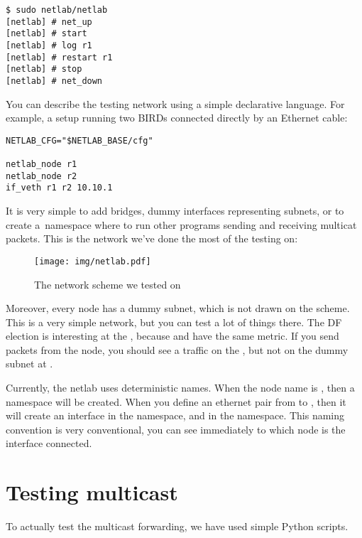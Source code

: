 \begin{lstlisting}
$ sudo netlab/netlab
[netlab] # net_up
[netlab] # start
[netlab] # log r1
[netlab] # restart r1
[netlab] # stop
[netlab] # net_down
\end{lstlisting}

\noindent You can describe the testing network using a simple declarative language. For
example, a setup running two BIRDs connected directly by an Ethernet cable:

\begin{lstlisting}
NETLAB_CFG="$NETLAB_BASE/cfg"

netlab_node r1
netlab_node r2
if_veth r1 r2 10.10.1
\end{lstlisting}

\noindent It is very simple to add bridges, dummy interfaces representing subnets, or to
create a~namespace where to run other programs sending and receiving multicat
packets. This is the network we've done the most of the testing on:

\begin{figure}[htp]
\centering
\texttt{[image: img/netlab.pdf]}
\caption{The network scheme we tested on}
\label{netlab}
\end{figure}

Moreover, every node has a dummy subnet, which is not drawn on the scheme.
This is a very simple network, but you can test a lot of things there. The DF
election is interesting at the , because  and 
have the same metric. If you send packets from the  node, you should see
a traffic on the , but not on the dummy subnet at .

Currently, the netlab uses deterministic names. When the node name is
, then a namespace  will be created. When you define
an ethernet pair from  to , then it will create an interface
 in the  namespace, and  in the
 namespace. This naming convention is very conventional, you can
see immediately to which node is the interface connected.

\section{Testing multicast}
To actually test the multicast forwarding, we have used simple Python scripts.

